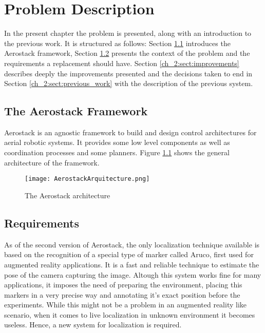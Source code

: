 \chapter{Problem Description}

In the present chapter the problem is presented, along with an introduction to the previous work. It is structured as follows: Section \ref{ch_2:sect:aerostack} introduces the Aerostack framework, Section \ref{ch_2:sect:requirements} presents the context of the problem and the requirements a replacement should have. Section \ref{ch_2:sect:improvements} describes deeply the improvements presented and the decisions taken to end in Section \ref{ch_2:sect:previous_work} with the description of the previous system.

  \section{The Aerostack Framework} \label{ch_2:sect:aerostack}

    Aerostack is an agnostic framework to build and design control architectures for aerial robotic systems. It provides some low level components as well as coordination processes and some planners. Figure \ref{ch_2:fig:aerostack_arqu} shows the general architecture of the framework.

    \begin{figure}[ht]
      \centering
      \texttt{[image: AerostackArquitecture.png]}
      \caption{The Aerostack architecture}
      \label{ch_2:fig:aerostack_arqu}
    \end{figure}

  \section{Requirements} \label{ch_2:sect:requirements}

    As of the second version of Aerostack, the only localization technique available is based on the recognition of a special type of marker called Aruco, first used for augmented reality applications. It is a fast and reliable technique to estimate the pose of the camera capturing the image. Altough this system works fine for many applications, it imposes the need of preparing the environment, placing this markers in a very precise way and annotating it's exact position before the experiments. While this might not be a problem in an augmented reality like scenario, when it comes to live localization in unknown environment it becomes useless. Hence, a new system for localization is required.

